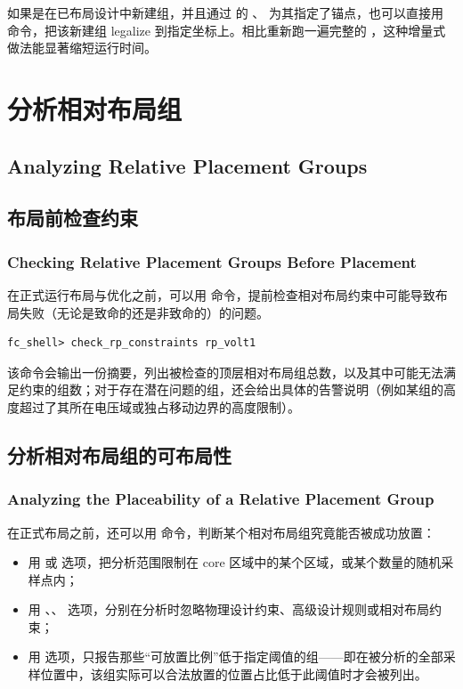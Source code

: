 如果是在已布局设计中新建组，并且通过  的 、 为其指定了锚点，也可以直接用  命令，把该新建组 legalize 到指定坐标上。相比重新跑一遍完整的 ，这种增量式做法能显著缩短运行时间。

\section{分析相对布局组}
\subsection*{Analyzing Relative Placement Groups}

\subsection{布局前检查约束}
\subsubsection*{Checking Relative Placement Groups Before Placement}

在正式运行布局与优化之前，可以用  命令，提前检查相对布局约束中可能导致布局失败（无论是致命的还是非致命的）的问题。

\begin{lstlisting}
fc_shell> check_rp_constraints rp_volt1
\end{lstlisting}

该命令会输出一份摘要，列出被检查的顶层相对布局组总数，以及其中可能无法满足约束的组数；对于存在潜在问题的组，还会给出具体的告警说明（例如某组的高度超过了其所在电压域或独占移动边界的高度限制）。

\subsection{分析相对布局组的可布局性}
\subsubsection*{Analyzing the Placeability of a Relative Placement Group}

在正式布局之前，还可以用  命令，判断某个相对布局组究竟能否被成功放置：
\begin{itemize}
  \item 用  或  选项，把分析范围限制在 core 区域中的某个区域，或某个数量的随机采样点内；
  \item 用 、、 选项，分别在分析时忽略物理设计约束、高级设计规则或相对布局约束；
  \item 用  选项，只报告那些“可放置比例”低于指定阈值的组——即在被分析的全部采样位置中，该组实际可以合法放置的位置占比低于此阈值时才会被列出。
\end{itemize}

